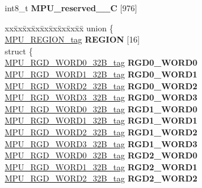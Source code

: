 \begin{DoxyCompactItemize}
\begin{tabbing}
\end{tabbing}\item 
\mbox{\label{structMPU__struct__tag_aea301f523d4eaf237719d482cd4fc56c}} 
int8\+\_\+t {\bfseries M\+P\+U\+\_\+reserved\+\_\+\_\+C} \mbox{[}976\mbox{]}
\item 
\mbox{\label{structMPU__struct__tag_ada4914f84d01de8b15b2e903381e2889}} 
\begin{tabbing}
xx\=xx\=xx\=xx\=xx\=xx\=xx\=xx\=xx\=\kill
union \{\\
\>\mbox{\hyperlink{structMPU__REGION__struct__tag}{MPU\_REGION\_tag}} {\bfseries REGION} \mbox{[}16\mbox{]}\\
\mbox{\label{unionMPU__struct__tag_1_1_0D2159_a5081c8fa24eab54ada78e7356bbe5f3d}} 
\>struct \{\\
\>\>\mbox{\hyperlink{unionMPU__RGD__WORD0__32B__tag}{MPU\_RGD\_WORD0\_32B\_tag}} {\bfseries RGD0\_WORD0}\\
\>\>\mbox{\hyperlink{unionMPU__RGD__WORD1__32B__tag}{MPU\_RGD\_WORD1\_32B\_tag}} {\bfseries RGD0\_WORD1}\\
\>\>\mbox{\hyperlink{unionMPU__RGD__WORD2__32B__tag}{MPU\_RGD\_WORD2\_32B\_tag}} {\bfseries RGD0\_WORD2}\\
\>\>\mbox{\hyperlink{unionMPU__RGD__WORD3__32B__tag}{MPU\_RGD\_WORD3\_32B\_tag}} {\bfseries RGD0\_WORD3}\\
\>\>\mbox{\hyperlink{unionMPU__RGD__WORD0__32B__tag}{MPU\_RGD\_WORD0\_32B\_tag}} {\bfseries RGD1\_WORD0}\\
\>\>\mbox{\hyperlink{unionMPU__RGD__WORD1__32B__tag}{MPU\_RGD\_WORD1\_32B\_tag}} {\bfseries RGD1\_WORD1}\\
\>\>\mbox{\hyperlink{unionMPU__RGD__WORD2__32B__tag}{MPU\_RGD\_WORD2\_32B\_tag}} {\bfseries RGD1\_WORD2}\\
\>\>\mbox{\hyperlink{unionMPU__RGD__WORD3__32B__tag}{MPU\_RGD\_WORD3\_32B\_tag}} {\bfseries RGD1\_WORD3}\\
\>\>\mbox{\hyperlink{unionMPU__RGD__WORD0__32B__tag}{MPU\_RGD\_WORD0\_32B\_tag}} {\bfseries RGD2\_WORD0}\\
\>\>\mbox{\hyperlink{unionMPU__RGD__WORD1__32B__tag}{MPU\_RGD\_WORD1\_32B\_tag}} {\bfseries RGD2\_WORD1}\\
\>\>\mbox{\hyperlink{unionMPU__RGD__WORD2__32B__tag}{MPU\_RGD\_WORD2\_32B\_tag}} {\bfseries RGD2\_WORD2}\\

\end{tabbing}
\end{DoxyCompactItemize}
